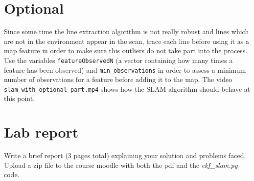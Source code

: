 \documentclass[a4paper,10pt]{article}
\begin{document}
\section{Optional}
Since some time the line extraction algorithm is not really robust and lines which are not in the environment appear in the scan, trace each line before using it as a map feature in order to make sure this outliers do not take part into the process. Use the variables \texttt{featureObservedN} (a vector containing how many times a feature has been observed) and \texttt{min\_observations} in order to assess a minimum number of observations for a feature before adding it to the map. The video \texttt{slam\_with\_optional\_part.mp4} shows how the SLAM algorithm should behave at this point.

\section{Lab report}
Write a brief report (3 pages total) explaining your solution and problems faced. Upload a zip file to the course moodle with both the pdf and the \textit{ekf\_slam.py} code.
\end{document}
